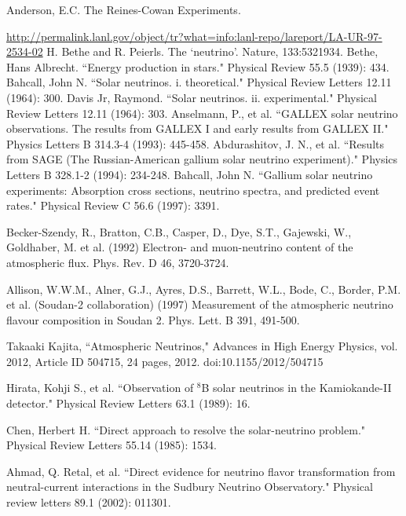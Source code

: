 \documentclass[preprint,12pt]{elsarticle}
\numberwithin{equation}{section}
\begin{document}
\begin{thebibliography}{00}
 Anderson, E.C. The Reines-Cowan Experiments. 

\url{http://permalink.lanl.gov/object/tr?what=info:lanl-repo/lareport/LA-UR-97-2534-02}
 H. Bethe and R. Peierls. The `neutrino'. Nature, 133:5321934.
 Bethe, Hans Albrecht. ``Energy production in stars." Physical Review 55.5 (1939): 434.
 Bahcall, John N. ``Solar neutrinos. i. theoretical." Physical Review Letters 12.11 (1964): 300.
 Davis Jr, Raymond. ``Solar neutrinos. ii. experimental." Physical Review Letters 12.11 (1964): 303.
 Anselmann, P., et al. ``GALLEX solar neutrino observations. The results from GALLEX I and early results from GALLEX II." Physics Letters B 314.3-4 (1993): 445-458.
 Abdurashitov, J. N., et al. ``Results from SAGE (The Russian-American gallium solar neutrino experiment)." Physics Letters B 328.1-2 (1994): 234-248.
 Bahcall, John N. ``Gallium solar neutrino experiments: Absorption cross sections, neutrino spectra, and predicted event rates." Physical Review C 56.6 (1997): 3391.

 Becker-Szendy, R., Bratton, C.B., Casper, D., Dye, S.T., Gajewski, W., Goldhaber, M. et al. (1992) Electron- and muon-neutrino content of the atmospheric flux. Phys. Rev. D 46, 3720-3724.

 Allison, W.W.M., Alner, G.J., Ayres, D.S., Barrett, W.L., Bode, C., Border, P.M. et al. (Soudan-2 collaboration) (1997) Measurement of the atmospheric neutrino flavour composition in Soudan 2. Phys. Lett. B 391, 491-500.

 Takaaki Kajita, ``Atmospheric Neutrinos," Advances in High Energy Physics, vol. 2012, Article ID 504715, 24 pages, 2012. doi:10.1155/2012/504715

 Hirata, Kohji S., et al. ``Observation of $^8$B solar neutrinos in the Kamiokande-II detector." Physical Review Letters 63.1 (1989): 16.

 Chen, Herbert H. ``Direct approach to resolve the solar-neutrino problem." Physical Review Letters 55.14 (1985): 1534.

 Ahmad, Q. Retal, et al. ``Direct evidence for neutrino flavor transformation from neutral-current interactions in the Sudbury Neutrino Observatory." Physical review letters 89.1 (2002): 011301.


\end{thebibliography}
\end{document}

